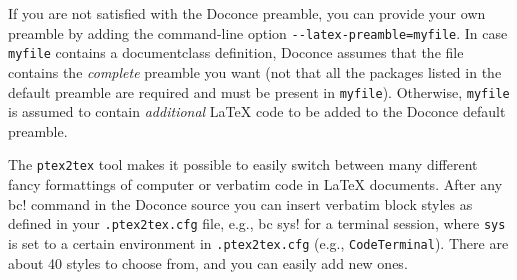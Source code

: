 \documentclass[%
oneside,                 %
final,                   %
10pt]{article}
\begin{document}
{{\noindent
If you are not satisfied with the Doconce preamble, you can provide
your own preamble by adding the command-line option {\fontsize{10pt}{10pt}\Verb!--latex-preamble=myfile!}.
In case {\fontsize{10pt}{10pt}\Verb!myfile!} contains a documentclass definition, Doconce assumes
that the file contains the \emph{complete} preamble you want (not that all
the packages listed in the default preamble are required and must be
present in {\fontsize{10pt}{10pt}\Verb!myfile!}). Otherwise, {\fontsize{10pt}{10pt}\Verb!myfile!} is assumed to contain
\emph{additional} {\LaTeX} code to be added to the Doconce default preamble.

The {\fontsize{10pt}{10pt}\Verb!ptex2tex!} tool makes it possible to easily switch between many
different fancy formattings of computer or verbatim code in {\LaTeX}
documents. After any {\fontsize{10pt}{10pt}\Verb!!bc!} command in the Doconce source you can
insert verbatim block styles as defined in your {\fontsize{10pt}{10pt}\Verb!.ptex2tex.cfg!}
file, e.g., {\fontsize{10pt}{10pt}\Verb!!bc sys!} for a terminal session, where {\fontsize{10pt}{10pt}\Verb!sys!} is set to
a certain environment in {\fontsize{10pt}{10pt}\Verb!.ptex2tex.cfg!} (e.g., {\fontsize{10pt}{10pt}\Verb!CodeTerminal!}).
There are about 40 styles to choose from, and you can easily add
new ones.

}}
\end{document}
